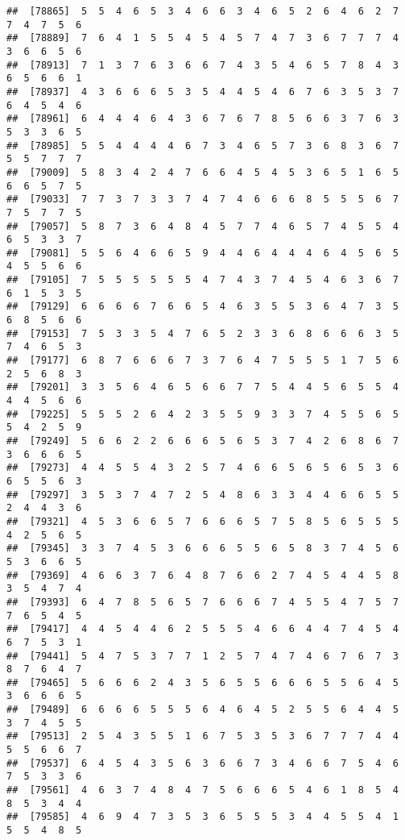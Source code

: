 \documentclass[
]{book}
\begin{document}
\begin{verbatim}
##  [78865]  5  5  4  6  5  3  4  6  6  3  4  6  5  2  6  4  6  2  7  7  4  7  5  6
##  [78889]  7  6  4  1  5  5  4  5  4  5  7  4  7  3  6  7  7  7  4  3  6  6  5  6
##  [78913]  7  1  3  7  6  3  6  6  7  4  3  5  4  6  5  7  8  4  3  6  5  6  6  1
##  [78937]  4  3  6  6  6  5  3  5  4  4  5  4  6  7  6  3  5  3  7  6  4  5  4  6
##  [78961]  6  4  4  4  6  4  3  6  7  6  7  8  5  6  6  3  7  6  3  5  3  3  6  5
##  [78985]  5  5  4  4  4  4  6  7  3  4  6  5  7  3  6  8  3  6  7  5  5  7  7  7
##  [79009]  5  8  3  4  2  4  7  6  6  4  5  4  5  3  6  5  1  6  5  6  6  5  7  5
##  [79033]  7  7  3  7  3  3  7  4  7  4  6  6  6  8  5  5  5  6  7  7  5  7  7  5
##  [79057]  5  8  7  3  6  4  8  4  5  7  7  4  6  5  7  4  5  5  4  6  5  3  3  7
##  [79081]  5  5  6  4  6  6  5  9  4  4  6  4  4  4  6  4  5  6  5  4  5  5  6  6
##  [79105]  7  5  5  5  5  5  5  4  7  4  3  7  4  5  4  6  3  6  7  6  1  5  3  5
##  [79129]  6  6  6  6  7  6  6  5  4  6  3  5  5  3  6  4  7  3  5  6  8  5  6  6
##  [79153]  7  5  3  3  5  4  7  6  5  2  3  3  6  8  6  6  6  3  5  7  4  6  5  3
##  [79177]  6  8  7  6  6  6  7  3  7  6  4  7  5  5  5  1  7  5  6  2  5  6  8  3
##  [79201]  3  3  5  6  4  6  5  6  6  7  7  5  4  4  5  6  5  5  4  4  4  5  6  6
##  [79225]  5  5  5  2  6  4  2  3  5  5  9  3  3  7  4  5  5  6  5  5  4  2  5  9
##  [79249]  5  6  6  2  2  6  6  6  5  6  5  3  7  4  2  6  8  6  7  3  6  6  6  5
##  [79273]  4  4  5  5  4  3  2  5  7  4  6  6  5  6  5  6  5  3  6  6  5  5  6  3
##  [79297]  3  5  3  7  4  7  2  5  4  8  6  3  3  4  4  6  6  5  5  2  4  4  3  6
##  [79321]  4  5  3  6  6  5  7  6  6  6  5  7  5  8  5  6  5  5  5  4  2  5  6  5
##  [79345]  3  3  7  4  5  3  6  6  6  5  5  6  5  8  3  7  4  5  6  5  3  6  6  5
##  [79369]  4  6  6  3  7  6  4  8  7  6  6  2  7  4  5  4  4  5  8  3  5  4  7  4
##  [79393]  6  4  7  8  5  6  5  7  6  6  6  7  4  5  5  4  7  5  7  7  6  5  4  5
##  [79417]  4  4  5  4  4  6  2  5  5  5  4  6  6  4  4  7  4  5  4  6  7  5  3  1
##  [79441]  5  4  7  5  3  7  7  1  2  5  7  4  7  4  6  7  6  7  3  8  7  6  4  7
##  [79465]  5  6  6  6  2  4  3  5  6  5  5  6  6  6  5  5  6  4  5  3  6  6  6  5
##  [79489]  6  6  6  6  5  5  5  6  4  6  4  5  2  5  5  6  4  4  5  3  7  4  5  5
##  [79513]  2  5  4  3  5  5  1  6  7  5  3  5  3  6  7  7  7  4  4  5  5  6  6  7
##  [79537]  6  4  5  4  3  5  6  3  6  6  7  3  4  6  6  7  5  4  6  7  5  3  3  6
##  [79561]  4  6  3  7  4  8  4  7  5  6  6  6  5  4  6  1  8  5  4  8  5  3  4  4
##  [79585]  4  6  9  4  7  3  5  3  6  5  5  5  3  4  4  5  5  4  1  5  5  4  8  5

\end{verbatim}
\end{document}
